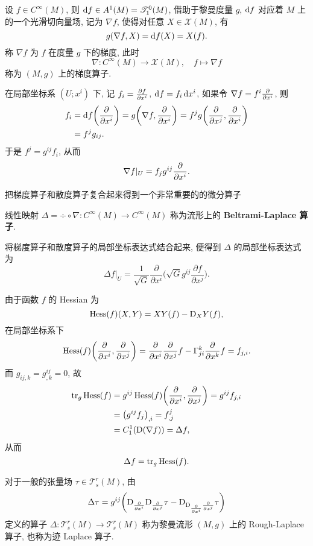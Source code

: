 \begin{definition}
  设 $f\in C^{\infty}(M)$, 则 $\mathop{}\!\mathrm{d} f\in A^1(M)=\mathscr{T}_1^0(M)$, 
  借助于黎曼度量 $g$, $\mathop{}\!\mathrm{d} f$ 对应着 $M$ 上的一个光滑切向量场, 记为 $\nabla f$,
  使得对任意 $X\in\mathscr{X}(M)$, 有
  \[g(\nabla f,X) = \mathop{}\!\mathrm{d} f(X) = X(f).\]
  称 $\nabla f$ 为 $f$ 在度量 $g$ 下的梯度, 此时
  \[\nabla\colon C^{\infty}(M)\to\mathscr{X}(M),\quad f\mapsto \nabla f\]
  称为 $(M,g)$ 上的梯度算子.
\end{definition}

在局部坐标系 $(U;x^i)$ 下, 记 $f_i=\pdv{f}{x^i}$,
$\mathop{}\!\mathrm{d} f=f_i\mathop{}\!\mathrm{d} x^i$, 如果令 $\nabla f = f^i\pdv{x^i}$, 则
\begin{align*}
  f_i
  & = \mathop{}\!\mathrm{d} f\biggl(\pdv{x^i}\biggr) = g\biggl(\nabla f,\pdv{x^i}\biggr)
    = f^j g\biggl(\pdv{x^j},\pdv{x^i}\biggr) \\
  & = f^j g_{ij}.
\end{align*}
于是 $f^j = g^{ij}f_i$, 从而
\[\nabla f|_U = f_j g^{ij} \pdv{x^i}.\]

把梯度算子和散度算子复合起来得到一个非常重要的的微分算子
\begin{definition}
  线性映射 $\Delta = \div\circ\nabla\colon C^{\infty}(M)\to C^{\infty}(M)$
  称为流形上的 \textbf{Beltrami-Laplace 算子}.
\end{definition}

将梯度算子和散度算子的局部坐标表达式结合起来, 便得到 $\Delta$ 的局部坐标表达式为
\[\Delta f|_U = \frac{1}{\sqrt{G}}\frac{\partial}{\partial x^i}
  \biggl(\sqrt{G}g^{ij}\frac{\partial f}{\partial x^j}\biggr).\]

由于函数 $f$ 的 Hessian 为
\[\operatorname{Hess}(f)(X,Y) = XY(f)-\mathrm{D}_XY(f),\]
在局部坐标系下
\[\operatorname{Hess}(f)\biggl(\pdv{x^i},\pdv{x^j}\biggr)
  = \pdv{x^i}\pdv{x^j}f - \Gamma_{ji}^k\pdv{x^k}f = f_{j,i}.\]
而 $g_{ij,k} = g^{ij}_{,k}=0$, 故
\begin{align*}
  \tr_g \operatorname{Hess}(f)
  & = g^{ij}\operatorname{Hess}(f)\biggl(\pdv{x^i},\pdv{x^j}\biggr) = g^{ij}f_{j,i} \\
  & = \bigl(g^{ij}f_j\bigr)_{,i} = f^j_{,j} \\
  & = C_1^1(\mathrm{D}(\nabla f)) = \Delta f,
\end{align*}
从而
\[\Delta f = \tr_g\operatorname{Hess}(f).\]

对于一般的张量场 $\tau\in\mathscr{T}_s^r(M)$, 由
\[\Delta\tau = g^{ij}\biggl(\mathrm{D}_{\pdv{x^i}}\mathrm{D}_{\pdv{x^j}}\tau
  - \mathrm{D}_{\mathrm{D}_{\pdv{x^i}}\pdv{x^j}}\tau\biggr)\]
定义的算子 $\Delta\colon\mathscr{T}_s^r(M)\to\mathscr{T}_s^r(M)$
称为黎曼流形 $(M,g)$ 上的 Rough-Laplace 算子, 也称为迹 Laplace 算子.



